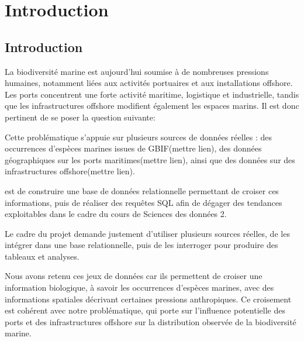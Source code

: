 \documentclass[mstat,12pt]{unswthesis}
\begin{document}



\chapter{Introduction}\label{introduction}

\section{Introduction}\label{introduction-1}

La biodiversité marine est aujourd'hui soumise à de nombreuses pressions
humaines, notamment liées aux activités portuaires et aux installations
offshore. Les ports concentrent une forte activité maritime, logistique
et industrielle, tandis que les infrastructures offshore modifient
également les espaces marins. Il est donc pertinent de se poser la
question suivante:

\bigskip

\medskip

\justifying

Cette problématique s'appuie sur plusieurs sources de données réelles :
des occurrences d'espèces marines issues de GBIF(mettre lien), des
données géographiques sur les ports maritimes(mettre lien), ainsi que
des données sur des infrastructures offshore(mettre lien).

\medskip

 est de construire une base de données
relationnelle permettant de croiser ces informations, puis de réaliser
des requêtes SQL afin de dégager des tendances exploitables dans le
cadre du cours de Sciences des données 2.

\medskip

Le cadre du projet demande justement d'utiliser plusieurs sources
réelles, de les intégrer dans une base relationnelle, puis de les
interroger pour produire des tableaux et analyses.

\medskip

Nous avons retenu ces jeux de données car ils permettent de croiser une
information biologique, à savoir les occurrences d'espèces marines, avec
des informations spatiales décrivant certaines pressions anthropiques.
Ce croisement est cohérent avec notre problématique, qui porte sur
l'influence potentielle des ports et des infrastructures offshore sur la
distribution observée de la biodiversité marine.
\end{document}
